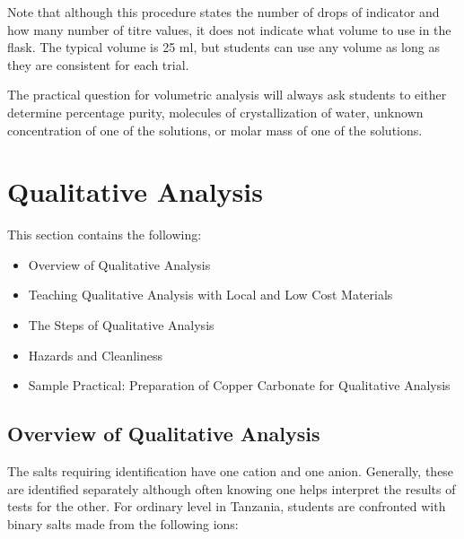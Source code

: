 Note that although this procedure states the number of drops of indicator and how many number of titre values, it does not indicate what volume to use in the flask. The typical volume is 25 ml, but students can use any volume as long as they are consistent for each trial.

The practical question for volumetric analysis will always ask students to either determine percentage purity, molecules of crystallization of water, unknown concentration of one of the solutions, or molar mass of one of the solutions. %





\section{Qualitative Analysis}
\label{cha:qualana}

This section contains the following:
\begin{itemize}
\item Overview of Qualitative Analysis
\item Teaching Qualitative Analysis with Local and Low Cost Materials
\item The Steps of Qualitative Analysis
\item Hazards and Cleanliness
\item Sample Practical: Preparation of Copper Carbonate for Qualitative Analysis
\end{itemize}


\subsection{Overview of Qualitative Analysis}

The salts requiring identification have one cation and one anion. Generally, these are identified separately although often knowing one helps interpret the results of tests for the other. For ordinary level in Tanzania, students are confronted with binary salts made from the following ions:

